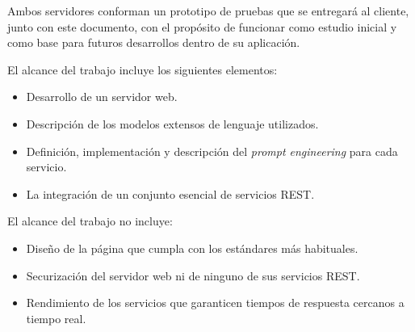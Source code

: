 Ambos servidores conforman un prototipo de pruebas que se entregará al cliente,
junto con este documento, con el propósito de funcionar como estudio inicial y
como base para futuros desarrollos dentro de su aplicación.

El alcance del trabajo incluye los siguientes elementos:
\begin{itemize}
	\item Desarrollo de un servidor web.
	\item Descripción de los modelos extensos de lenguaje utilizados.
	\item Definición, implementación y descripción del \textit{prompt engineering} para cada servicio.
	\item La integración de un conjunto esencial de servicios REST.
\end{itemize}

El alcance del trabajo no incluye:
\begin{itemize}
	\item Diseño de la página que cumpla con los estándares más habituales.
	\item Securización del servidor web ni de ninguno de sus servicios REST.
	\item Rendimiento de los servicios que garanticen tiempos de respuesta cercanos a tiempo real.
\end{itemize}